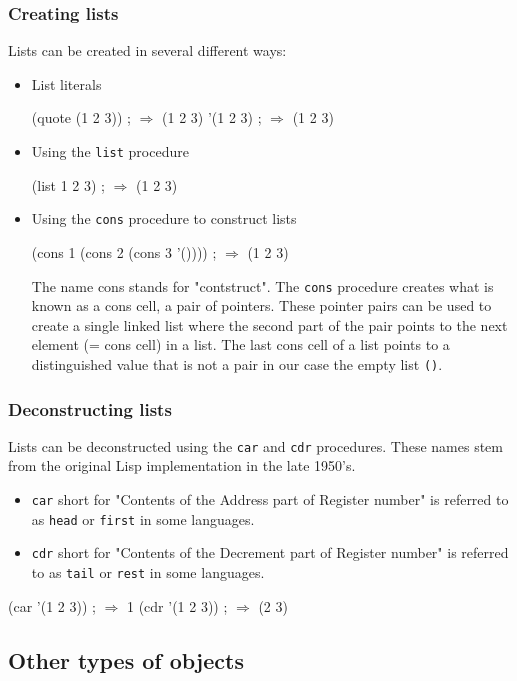 \documentclass[12pt,a4paper,english,twoside]{article}
\begin{document}
\subsubsection{Creating lists}
Lists can be created in several different ways:
\begin{itemize}
\item List literals 
\begin{schemecode}
(quote (1 2 3)) ; $\Rightarrow$ (1 2 3)
'(1 2 3) ; $\Rightarrow$ (1 2 3)
\end{schemecode}
\item Using the \texttt{list} procedure
\begin{schemecode}
(list 1 2 3) ; $\Rightarrow$ (1 2 3)
\end{schemecode}
\item Using the \texttt{cons} procedure to construct lists  
\begin{schemecode}
(cons 1 (cons 2 (cons 3 '()))) ; $\Rightarrow$ (1 2 3)
\end{schemecode}
The name cons stands for "contstruct". The \texttt{cons} procedure creates what is known as a cons cell, a pair of pointers. These pointer pairs can be used to create a single linked list where the second part of the pair points to the next element (= cons cell) in a list. The last cons cell of a list points to a distinguished value that is not a pair in our case the empty list \texttt{()}. 
\end{itemize}
\subsubsection{Deconstructing lists}
Lists can be deconstructed using the \texttt{car} and \texttt{cdr} procedures. These names stem from the original Lisp implementation in the late 1950's. 
\begin{itemize}
\item \texttt{car} short for "Contents of the Address part of Register number" is referred to as \texttt{head} or \texttt{first} in some languages.
\item \texttt{cdr} short for "Contents of the Decrement part of Register number" is referred to as \texttt{tail} or \texttt{rest} in some languages.
\end{itemize} 
\begin{schemecode}
(car '(1 2 3)) ; $\Rightarrow$ 1
(cdr '(1 2 3)) ; $\Rightarrow$ (2 3)
\end{schemecode}
\subsection{Other types of objects}
\end{document}
